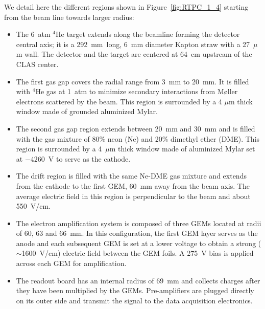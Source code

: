 \documentclass[preprint,5p]{elsarticle}
\begin{document}
We detail here the different regions shown in Figure~\ref{fig:RTPC_1_4} 
starting from the beam line towards larger radius:\\
\begin{itemize}
  \item The 6~atm $^4$He target extends along the beamline forming the detector 
     central axis; it is a 292~mm~long, 6~mm diameter Kapton straw with a 
     27~$\mu$m wall. The detector and the target are centered at 64~cm upstream 
     of the CLAS center.
   \item The first gas gap covers the radial range from 3~mm to 20~mm. It is 
      filled with $^{4}$He gas at 1~atm to minimize secondary interactions from
      M\o{}ller electrons scattered by the beam. This region is surrounded by 
      a 4 $\mu$m thick window made of grounded aluminized Mylar.
   \item The second gas gap region extends between 20~mm and 30~mm and is 
      filled with the gas mixture of 80$\%$ neon (Ne) and 20$\%$ dimethyl ether 
      (DME).  This region is surrounded by a 4~$\mu$m thick window made of 
      aluminized Mylar set at $-4260$~V to serve as the cathode.
   \item The drift region is filled with the same Ne-DME gas mixture and 
      extends from the cathode to the first GEM, 60~mm away from the beam axis.  
      The average electric field in this region is perpendicular to the beam 
      and about 550~V/cm.
   \item The electron amplification system is composed of three GEMs located at 
      radii of 60, 63 and 66~mm. In this configuration, the first GEM layer 
      serves as the anode and each subsequent GEM is set at a lower voltage to
      obtain a strong ($\sim$1600~V/cm) electric field between the GEM foils. A 
      275~V bias is applied across each GEM for amplification.
   \item The readout board has an internal radius of 69~mm and collects charges 
      after they have been multiplied by the GEMs. Pre-amplifiers are plugged 
      directly on its outer side and transmit the signal to the data 
      acquisition electronics.
\end{itemize}
\end{document}
